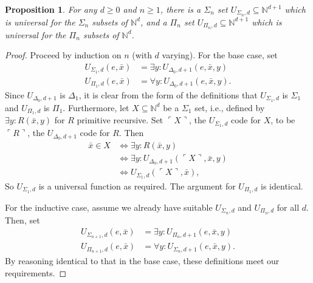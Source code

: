 \documentclass{article}
\theoremstyle{plain}
\newtheorem{prop}[thm]{Proposition}
\theoremstyle{definition}
\newcommand{\tuple}{\bar}
\newcommand{\lgnum}{\ulcorner}
\newcommand{\rgnum}{\urcorner}
\begin{document}
\begin{prop}
  For any $d \geq 0$ and $n \geq 1$, there is a $\Sigma_n$ set
  $U_{\Sigma_n,d} \subseteq \mathbb{N}^{d+1}$ which is universal for
  the $\Sigma_n$ subsets of $\mathbb{N}^d$, and a $\Pi_n$ set
  $U_{\Pi_n,d} \subseteq \mathbb{N}^{d+1}$ which is universal for the
  $\Pi_n$ subsets of $\mathbb{N}^d$.
\end{prop}
\begin{proof}
  Proceed by induction on $n$ (with $d$ varying). For the base case,
  set
  \begin{align*}
    U_{\Sigma_1,d}(e,\tuple{x}) &= \exists y : U_{\Delta_0,d+1}(e,\tuple{x},y) \\
    U_{\Pi_1,d}(e,\tuple{x}) &= \forall y : U_{\Delta_0,d+1}(e,\tuple{x},y)
    \text{.}
  \end{align*}
  Since $U_{\Delta_0,d+1}$ is $\Delta_1$, it is clear from the form of
  the definitions that $U_{\Sigma_1,d}$ is $\Sigma_1$ and
  $U_{\Pi_1,d}$ is $\Pi_1$. Furthermore, let $X \subseteq
  \mathbb{N}^d$ be a $\Sigma_1$ set, i.e., defined by $\exists y :
  R(\tuple{x},y)$ for $R$ primitive recursive. Set $\lgnum X \rgnum$,
  the $U_{\Sigma_1,d}$ code for $X$, to be $\lgnum R \rgnum$, the
  $U_{\Delta_0,d+1}$ code for $R$. Then
  \begin{align*}
    \tuple{x} \in X
    &\iff \exists y : R(\tuple{x}, y) \\
    &\iff \exists y : U_{\Delta_0,d+1}(\lgnum X \rgnum, \tuple{x}, y) \\
    &\iff U_{\Sigma_1,d}(\lgnum X \rgnum, \tuple{x})
    \text{,}
  \end{align*}
  So $U_{\Sigma_1,d}$ is a universal function as required. The
  argument for $U_{\Pi_1,d}$ is identical.

  For the inductive case, assume we already have suitable
  $U_{\Sigma_n,d}$ and $U_{\Pi_n,d}$ for all $d$. Then, set
  \begin{align*}
    U_{\Sigma_{n+1},d}(e,\tuple{x}) &= \exists y : U_{\Pi_n,d+1}(e,\tuple{x},y) \\
    U_{\Pi_{n+1},d}(e,\tuple{x}) &= \forall y : U_{\Sigma_n,d+1}(e,\tuple{x},y)
    \text{.}
  \end{align*}
  By reasoning identical to that in the base case, these definitions
  meet our requirements.
\end{proof}

\printbibliography
\end{document}

